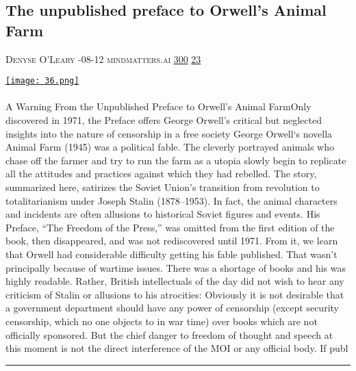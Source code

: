 \documentclass[10pt,a4paper]{article}
\begin{document}
\begin{multicols*}{2}
\begin{minipage}{\linewidth}
\subsection{The unpublished preface to Orwell’s Animal Farm}
\textsc{\footnotesize
{\scriptsize\faUser}\space 
Denyse O'Leary 
{\scriptsize\faCalendar}-08-12 
{\scriptsize\faGlobe}\space 
mindmatters.ai 
{\scriptsize\faThumbsOUp}\space 
\href{http://news.ycombinator.com/item?id=37129768\&utm\_term=comment}{300} 
{\scriptsize\faComments}\space 
\href{http://news.ycombinator.com/item?id=37129768\&utm\_term=comment}{23} 
}
\par\medskip\noindent
\href{https://mindmatters.ai/2023/08/a-warning-from-the-unpublished-preface-to-orwells-animal-farm/?utm\_source=hackernewsletter\&utm\_medium=email\&utm\_term=books}{
    \texttt{[image: 36.png]}
}
\end{minipage}
\paragraph{}
A Warning From the Unpublished Preface to Orwell’s Animal FarmOnly discovered in 1971, the Preface offers George Orwell’s critical but neglected insights into the nature of censorship in a free society
George Orwell‘s novella Animal Farm (1945) was a political fable. The cleverly portrayed animals who chase off the farmer and try to run the farm as a utopia slowly begin to replicate all the attitudes and practices against which they had rebelled. The story, summarized here, satirizes the Soviet Union’s transition from revolution to totalitarianism under Joseph Stalin (1878–1953). In fact, the animal characters and incidents are often allusions to historical Soviet figures and events.
His Preface, “The Freedom of the Press,” was omitted from the first edition of the book, then disappeared, and was not rediscovered until 1971. From it, we learn that Orwell had considerable difficulty getting his fable published. That wasn’t principally because of wartime issues. There was a shortage of books and his was highly readable. Rather, British intellectuals of the day did not wish to hear any criticism of Stalin or allusions to his atrocities:
Obviously it is not desirable that a government department should have any power of censorship (except security censorship, which no one objects to in war time) over books which are not officially sponsored. But the chief danger to freedom of thought and speech at this moment is not the direct interference of the MOI or any official body. If publ
\par\noindent\textcolor{red}{\rule{\linewidth}{0.2mm}}
\vfill
\null
\noindent\begin{minipage}{\linewidth}

\end{minipage}
\end{multicols*}
\end{document}
